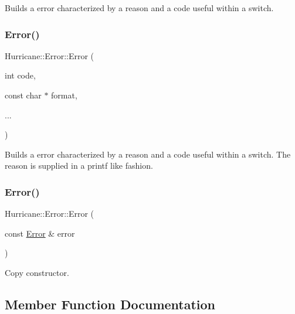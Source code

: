 Builds a error characterized by a reason and a code useful within a switch. \mbox{\label{classHurricane_1_1Error_a32ccc14fe29d7d2a7b5fe66ee0a3845c}} 
\subsubsection{\texorpdfstring{Error()}{Error()}\hspace{0.1cm}{\footnotesize\ttfamily [4/5]}}
{\footnotesize\ttfamily Hurricane\+::\+Error\+::\+Error (\begin{DoxyParamCaption}\item[{int}]{code,  }\item[{const char $\ast$}]{format,  }\item[{}]{... }\end{DoxyParamCaption})}

Builds a error characterized by a reason and a code useful within a switch. The reason is supplied in a {\ttfamily printf} like fashion. \mbox{\label{classHurricane_1_1Error_a7d90d5f5727dab2a9cc0a6427fb2b084}} 
\subsubsection{\texorpdfstring{Error()}{Error()}\hspace{0.1cm}{\footnotesize\ttfamily [5/5]}}
{\footnotesize\ttfamily Hurricane\+::\+Error\+::\+Error (\begin{DoxyParamCaption}\item[{const \hyperlink{classHurricane_1_1Error}{Error} \&}]{error }\end{DoxyParamCaption})}

Copy constructor. 

\subsection{Member Function Documentation}
\mbox{\label{classHurricane_1_1Error_a1a18927a2d4eb2b0b0acfc2908be7008}} 

